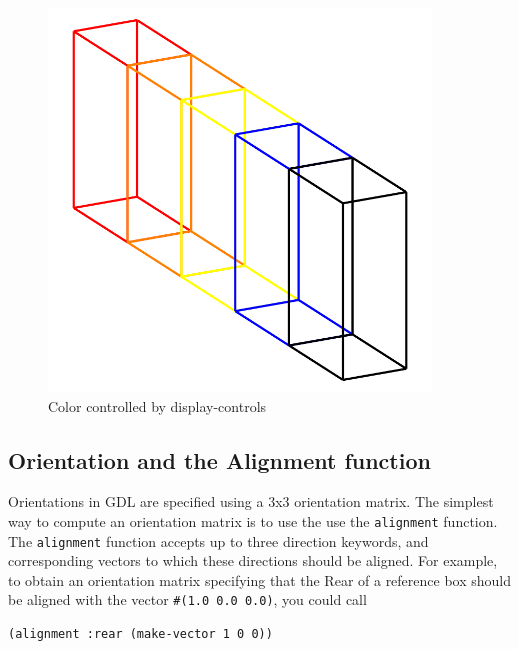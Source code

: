 \documentclass [11pt]{book}
\begin{document}
\begin{figure}
\begin{center}
\includegraphics[width=4in,height=4in]{../images/display-color.pdf}
\end{center}

\caption{Color controlled by display-controls}

\label{fig:display-color}

\end{figure}




\subsection{Orientation and the Alignment function}

\label{subsec:orientationandthealignmentfunction}



Orientations in GDL are specified using a 3x3 orientation
matrix. The simplest way to compute an orientation matrix is to use
the use the \texttt{alignment} function. The \texttt{alignment} function accepts up to three direction keywords, and
corresponding vectors to which these directions should be aligned. For
example, to obtain an orientation matrix specifying that the Rear of a
reference box should be aligned with the vector \texttt{\#(1.0 0.0 0.0)}, you could call 

\begin{verbatim}(alignment :rear (make-vector 1 0 0))
\end{verbatim}
\end{document}
